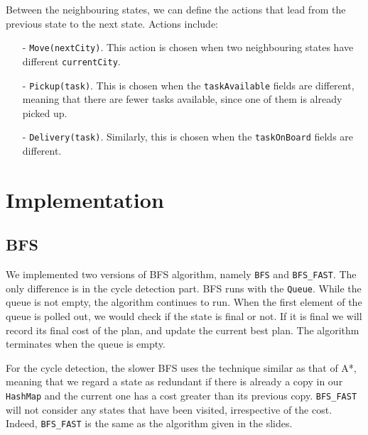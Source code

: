 \documentclass[11pt]{article}
\begin{document}
Between the neighbouring states, we can define the actions that lead from the previous state to the next state. Actions include:
\begin{enumerate}
	\item[-]\texttt{Move(nextCity)}. This action is chosen when two neighbouring states have different \texttt{currentCity}.
	\item[-]\texttt{Pickup(task)}. This is chosen when the \texttt{taskAvailable} fields are different, meaning that there are fewer tasks available, since one of them is already picked up. 
	\item[-]\texttt{Delivery(task)}. Similarly, this is chosen when the \texttt{taskOnBoard} fields are different.
	
\end{enumerate}

\section{Implementation}

\subsection{BFS}
We implemented two versions of BFS algorithm, namely \texttt{BFS} and \texttt{BFS\_FAST}. The only difference is in the cycle detection part. BFS runs with the \texttt{Queue}. While the queue is not empty, the algorithm continues to run. When the first element of the queue is polled out, we would check if the state is final or not. If it is final we will record its final cost of the plan, and update the current best plan. The algorithm terminates when the queue is empty.

For the cycle detection, the slower BFS uses the technique similar as that of A*, meaning that we regard a state as redundant if there is already a copy in our \texttt{HashMap} and the current one has a cost greater than its previous copy. \texttt{BFS\_FAST} will not consider any states that have been visited, irrespective of the cost. Indeed, \texttt{BFS\_FAST} is the same as the algorithm given in the slides.
\end{document}
